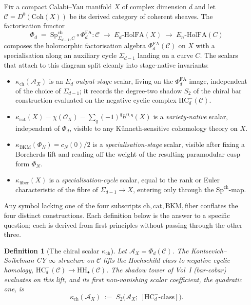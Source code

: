 \documentclass[11pt]{article}
\newtheorem{definition}[theorem]{Definition}
\newcommand{\cO}{\mathcal{O}}
\newcommand{\cA}{\mathcal{A}}
\newcommand{\cC}{\mathcal{C}}
\newcommand{\HH}{\mathrm{HH}}
\newcommand{\HC}{\mathrm{HC}}
\newcommand{\Coh}{\mathrm{Coh}}
\begin{document}
Fix a compact Calabi--Yau manifold $X$ of complex dimension $d$ and let
$\cC=D^{b}(\Coh(X))$ be its derived category of coherent sheaves. The
factorisation functor
\[
  \Phi_d
  \;=\;
  \mathrm{Sp}^{\mathrm{ch}}_{\Sigma_{d-1},C}\circ
  \Phi^{\mathrm{FA}}_d
  \colon
  \cC
  \;\longrightarrow\;
  E_d\text{-}\mathrm{HolFA}(X)
  \;\longrightarrow\;
  E_n\text{-}\mathrm{HolFA}(C)
\]
composes the holomorphic factorisation algebra $\Phi^{\mathrm{FA}}_d(\cC)$
on $X$ with a specialisation along an auxiliary cycle $\Sigma_{d-1}$
landing on a curve $C$. The scalars that attach to this diagram split
cleanly into stage-native invariants:
\begin{itemize}
\item $\kappa_{\mathrm{ch}}(\cA_X)$ is an $E_d$-\emph{output-stage}
scalar, living on the $\Phi^{\mathrm{FA}}_d$ image, independent of the
choice of $\Sigma_{d-1}$; it records the degree-two shadow $S_2$ of
the chiral bar construction evaluated on the negative cyclic complex
$\HC^{-}_d(\cC)$.
\item $\kappa_{\mathrm{cat}}(X)=\chi(\cO_X)=\sum_{q}(-1)^q h^{0,q}(X)$
is a \emph{variety-native} scalar, independent of $\Phi_d$, visible
to any K\"unneth-sensitive cohomology theory on $X$.
\item $\kappa_{\mathrm{BKM}}(\Phi_N)=c_N(0)/2$ is a
\emph{specialisation-stage} scalar, visible after fixing a
Borcherds lift and reading off the weight of the resulting paramodular
cusp form $\Phi_N$.
\item $\kappa_{\mathrm{fiber}}(X)$ is a \emph{specialisation-cycle}
scalar, equal to the rank or Euler characteristic of the fibre of
$\Sigma_{d-1}\to X$, entering only through the
$\mathrm{Sp}^{\mathrm{ch}}$-map.
\end{itemize}
Any symbol lacking one of the four subscripts $\mathrm{ch},\mathrm{cat},
\mathrm{BKM},\mathrm{fiber}$ conflates the four distinct constructions.
Each definition below is the answer to a specific question;
each is derived from first principles without passing through the
other three.

\begin{definition}[The chiral scalar $\kappa_{\mathrm{ch}}$]
\label{def:chiral-scalar}
Let $\cA_X=\Phi_d(\cC)$. The Kontsevich--Soibelman CY $\infty$-structure
on $\cC$ lifts the Hochschild class to negative cyclic homology,
$\HC^{-}_d(\cC)\to\HH_{\bullet}(\cC)$. The shadow tower of Vol~I
(bar-cobar) evaluates on this lift, and its first non-vanishing scalar
coefficient, the quadratic one, is
\[
  \kappa_{\mathrm{ch}}(\cA_X)
  \;:=\;
  S_2\bigl(\cA_X;\,[\HC^{-}_d\text{-class}]\bigr).
\]
\end{definition}
\end{document}
